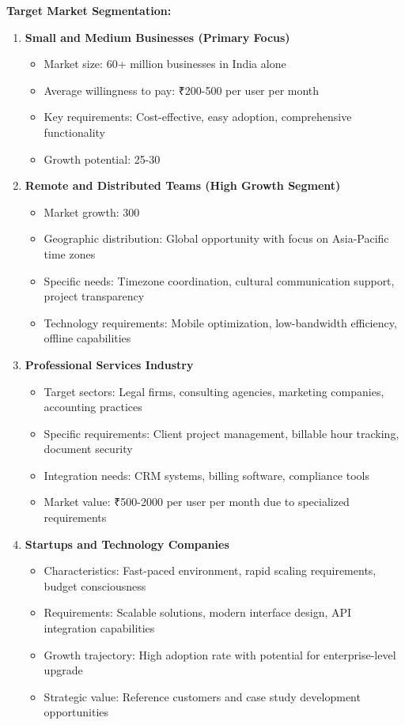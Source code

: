 \textbf{Target Market Segmentation:}
\begin{enumerate}
    \item \textbf{Small and Medium Businesses (Primary Focus)}
    \begin{itemize}
        \item Market size: 60+ million businesses in India alone
        \item Average willingness to pay: ₹200-500 per user per month
        \item Key requirements: Cost-effective, easy adoption, comprehensive functionality
        \item Growth potential: 25-30%
    \end{itemize}

    \item \textbf{Remote and Distributed Teams (High Growth Segment)}
    \begin{itemize}
        \item Market growth: 300%
        \item Geographic distribution: Global opportunity with focus on Asia-Pacific time zones
        \item Specific needs: Timezone coordination, cultural communication support, project transparency
        \item Technology requirements: Mobile optimization, low-bandwidth efficiency, offline capabilities
    \end{itemize}

    \item \textbf{Professional Services Industry}
    \begin{itemize}
        \item Target sectors: Legal firms, consulting agencies, marketing companies, accounting practices
        \item Specific requirements: Client project management, billable hour tracking, document security
        \item Integration needs: CRM systems, billing software, compliance tools
        \item Market value: ₹500-2000 per user per month due to specialized requirements
    \end{itemize}

    \item \textbf{Startups and Technology Companies}
    \begin{itemize}
        \item Characteristics: Fast-paced environment, rapid scaling requirements, budget consciousness
        \item Requirements: Scalable solutions, modern interface design, API integration capabilities
        \item Growth trajectory: High adoption rate with potential for enterprise-level upgrade
        \item Strategic value: Reference customers and case study development opportunities
    \end{itemize}
\end{enumerate}

